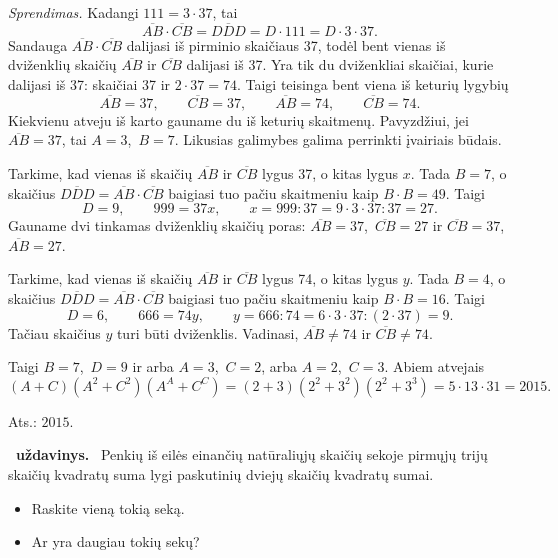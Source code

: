 \documentclass[11pt,a4paper]{article}
\newcounter{uzdavinys}
\newenvironment{uzdavinys}
  {\refstepcounter{uzdavinys}\par\medskip\noindent\textbf{\theuzdavinys\ uždavinys.}\ }
  {\par\medskip}
\begin{document}
\textit{Sprendimas.} Kadangi $111 = 3\cdot 37$, tai $$\overline{AB} \cdot\overline{CB}=\overline{DDD} = D\cdot 111 = D\cdot 3 \cdot 37.$$ 
Sandauga $\overline{AB} \cdot\overline{CB}$ dalijasi iš pirminio skaičiaus 37, todėl bent vienas iš dviženklių skaičių 
$\overline{AB}$ ir $\overline{CB}$ dalijasi iš 37. Yra tik du dviženkliai skaičiai, kurie dalijasi iš 37: skaičiai 37 ir $2\cdot37=74$. Taigi teisinga bent viena iš keturių lygybių
$$\overline{AB}=37,\qquad\overline{CB}=37,\qquad \overline{AB}=74,\qquad \overline{CB}=74.$$
Kiekvienu atveju iš karto gauname du iš keturių skaitmenų. Pavyzdžiui, jei $\overline{AB}=37$, tai $A=3$, \,$B=7$. Likusias galimybes galima perrinkti įvairiais būdais.

Tarkime, kad vienas iš skaičių $\overline{AB}$ ir $\overline{CB}$ lygus 37, o kitas lygus $x$. Tada $B=7$, o skaičius $\overline{DDD}=\overline{AB} \cdot\overline{CB}$ baigiasi tuo pačiu skaitmeniu kaip $B\cdot B=49$. Taigi $$D=9,\qquad 999=37x,\qquad x=999:37=9\cdot3\cdot37:37=27.$$ Gauname dvi tinkamas dviženklių skaičių poras: $\overline{AB} = 37$, \,$\overline{CB} = 27$ ir $\overline{CB}=37$, \,$\overline{AB}=27$.

Tarkime, kad vienas iš skaičių $\overline{AB}$ ir $\overline{CB}$ lygus 74, o kitas lygus $y$. Tada $B=4$, o skaičius $\overline{DDD}=\overline{AB} \cdot\overline{CB}$ baigiasi tuo pačiu skaitmeniu kaip $B\cdot B=16$. Taigi $$D=6,\qquad 666=74y,\qquad y=666:74=6\cdot3\cdot37:(2\cdot37)=9.$$ Tačiau skaičius $y$ turi būti dviženklis. Vadinasi, $\overline{AB}\neq74$ ir $\overline{CB}\neq74$.

Taigi $B=7$, \,$D=9$ ir arba $A = 3$, \,$C=2$, arba $A = 2$, \,$C=3$. Abiem atvejais
\[
(A+C)(A^2+C^2)(A^A+C^C) = (2+3)(2^2+3^2)(2^2+3^3) =5\cdot13\cdot31=2015.
\]

\begin{flushright}
     Ats.: $2015$.
\end{flushright}
\vspace{3mm}


\begin{uzdavinys}  
Penkių iš eilės einančių natūraliųjų skaičių sekoje pirmųjų trijų skaičių 
kvadratų suma lygi paskutinių dviejų skaičių kvadratų sumai.
\begin{itemize}
\item[a)] Raskite vieną tokią seką.
\item[b)] Ar yra daugiau tokių sekų?
\end{itemize}
\end{uzdavinys}
\end{document}
